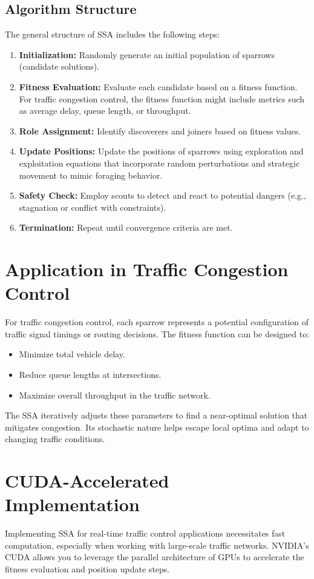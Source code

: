 \documentclass[11pt]{article}
\begin{document}
\subsection{Algorithm Structure}
The general structure of SSA includes the following steps:
\begin{enumerate}
    \item \textbf{Initialization:} Randomly generate an initial population of sparrows (candidate solutions).
    \item \textbf{Fitness Evaluation:} Evaluate each candidate based on a fitness function. For traffic congestion control, the fitness function might include metrics such as average delay, queue length, or throughput.
    \item \textbf{Role Assignment:} Identify discoverers and joiners based on fitness values.
    \item \textbf{Update Positions:} Update the positions of sparrows using exploration and exploitation equations that incorporate random perturbations and strategic movement to mimic foraging behavior.
    \item \textbf{Safety Check:} Employ scouts to detect and react to potential dangers (e.g., stagnation or conflict with constraints).
    \item \textbf{Termination:} Repeat until convergence criteria are met.
\end{enumerate}

\section{Application in Traffic Congestion Control}
For traffic congestion control, each sparrow represents a potential configuration of traffic signal timings or routing decisions. The fitness function can be designed to:
\begin{itemize}
    \item Minimize total vehicle delay.
    \item Reduce queue lengths at intersections.
    \item Maximize overall throughput in the traffic network.
\end{itemize}

The SSA iteratively adjusts these parameters to find a near-optimal solution that mitigates congestion. Its stochastic nature helps escape local optima and adapt to changing traffic conditions.

\section{CUDA-Accelerated Implementation}
Implementing SSA for real-time traffic control applications necessitates fast computation, especially when working with large-scale traffic networks. NVIDIA's CUDA allows you to leverage the parallel architecture of GPUs to accelerate the fitness evaluation and position update steps.
\end{document}
